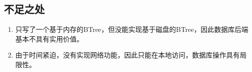 \documentclass[12pt,a4paper]{article}
\begin{document}
\subsection{不足之处}

\begin{enumerate}
\item
只写了一个基于内存的BTree，但没能实现基于磁盘的BTree，因此数据库后端基本不具有实用价值。
\item
由于时间紧迫，没有实现网络功能，因此只能在本地访问，数据库操作具有局限性。
\end{enumerate}
    
\end{document}
